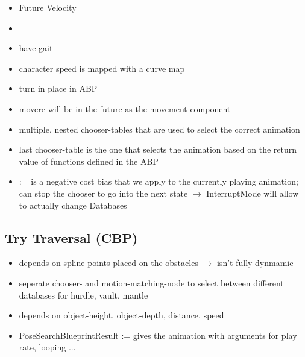         \begin{itemize}
            \item Future Velocity %
            \item 
        \end{itemize}

        \begin{itemize}
            \item have gait
            \item character speed is mapped with a curve map
            \item turn in place in ABP
            \item movere will be in the future as the movement component
        \end{itemize}


        \begin{itemize}
            \item multiple, nested chooser-tables that are used to select the correct animation
            \item last chooser-table is the one that selects the animation based on the return value of functions defined in the ABP
            \item {} := is a negative cost bias that we apply to the currently playing animation; can stop the chooser to go into the next state $\rightarrow$ InterruptMode will allow to actually change Databases
        \end{itemize}


        \subsection{Try Traversal (CBP)}
            \begin{itemize}
                \item depends on spline points placed on the obstacles $\rightarrow$ isn't fully dynmamic
                \item seperate chooser- and motion-matching-node to select between different databases for hurdle, vault, mantle
                \item depends on object-height, object-depth, distance, speed
                \item PoseSearchBlueprintResult := gives the animation with arguments for play rate, looping ...
            \end{itemize}
            